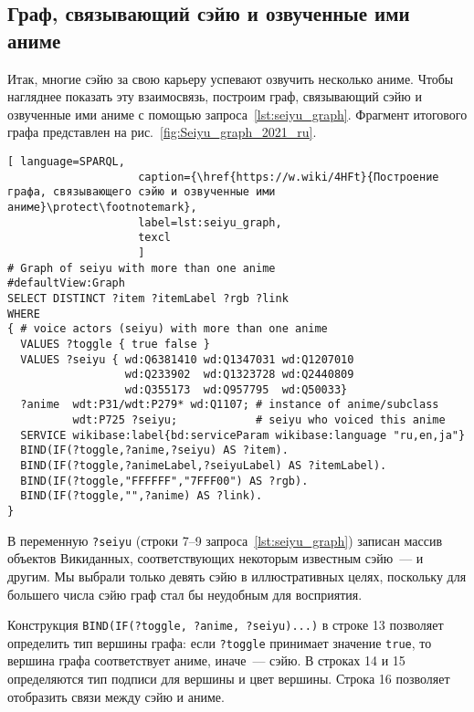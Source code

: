 \newpage
\subsection{Граф, связывающий сэйю и озвученные ими аниме}

Итак, многие сэйю за свою карьеру успевают озвучить несколько аниме. 
Чтобы нагляднее показать эту взаимосвязь, 
построим граф, связывающий сэйю и озвученные ими аниме с помощью запроса~\ref{lst:seiyu_graph}. 
Фрагмент итогового графа представлен на рис.~\ref{fig:Seiyu_graph_2021_ru}. 


\lstset{numbers=left, firstnumber=1, frame=single}
\begin{lstlisting}[ language=SPARQL, 
                    caption={\href{https://w.wiki/4HFt}{Построение графа, связывающего сэйю и озвученные ими аниме}\protect\footnotemark},
                    label=lst:seiyu_graph,
                    texcl 
                    ]
# Graph of seiyu with more than one anime
#defaultView:Graph
SELECT DISTINCT ?item ?itemLabel ?rgb ?link
WHERE
{ # voice actors (seiyu) with more than one anime
  VALUES ?toggle { true false }
  VALUES ?seiyu { wd:Q6381410 wd:Q1347031 wd:Q1207010 
                  wd:Q233902  wd:Q1323728 wd:Q2440809 
                  wd:Q355173  wd:Q957795  wd:Q50033}
  ?anime  wdt:P31/wdt:P279* wd:Q1107; # instance of anime/subclass
          wdt:P725 ?seiyu;            # seiyu who voiced this anime 
  SERVICE wikibase:label{bd:serviceParam wikibase:language "ru,en,ja"}
  BIND(IF(?toggle,?anime,?seiyu) AS ?item).
  BIND(IF(?toggle,?animeLabel,?seiyuLabel) AS ?itemLabel).
  BIND(IF(?toggle,"FFFFFF","7FFF00") AS ?rgb).
  BIND(IF(?toggle,"",?anime) AS ?link).
}
\end{lstlisting}%
\lstset{numbers=none}

В переменную \lstinline|?seiyu| (строки 7--9 запроса~\ref{lst:seiyu_graph}) записан массив объектов Викиданных, 
соответствующих некоторым известным сэйю~---  и другим. 
Мы выбрали только девять сэйю в иллюстративных целях, поскольку для большего числа сэйю граф стал бы неудобным для восприятия.

Конструкция \lstinline|BIND(IF(?toggle, ?anime, ?seiyu)...)| в строке \num{13} 
позволяет определить тип вершины графа: 
если \lstinline|?toggle| принимает значение \lstinline|true|, 
то вершина графа соответствует аниме, иначе~--- сэйю. 
В строках 14 и 15 определяются тип подписи для вершины и цвет вершины. 
Строка 16 позволяет отобразить связи между сэйю и аниме.

